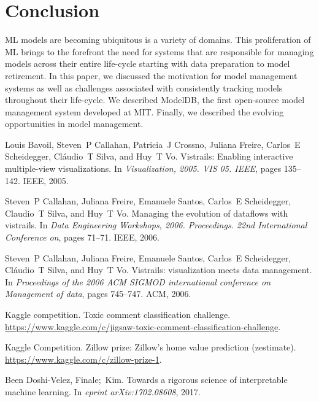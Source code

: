 \documentclass[11pt]{article}
\newcommand{\mdb}{{\sc ModelDB}\xspace}
\begin{document}
\section{Conclusion}
\label{sec:conclusion}
ML models are becoming ubiquitous is a variety of domains.
This proliferation of ML brings to the forefront the need for systems that are responsible for managing models across their entire life-cycle starting with data preparation to model retirement.
In this paper, we discussed the motivation for model management systems as well as challenges associated with consistently tracking models throughout their life-cycle.
We described \mdb, the first open-source model management system developed at MIT.
Finally, we described the evolving opportunities in model management.

\begin{thebibliography}{10} 
\itemsep=1pt 
\begin{small}
Louis Bavoil, Steven~P Callahan, Patricia~J Crossno, Juliana Freire, Carlos~E
  Scheidegger, Cl{\'a}udio~T Silva, and Huy~T Vo.
\newblock Vistrails: Enabling interactive multiple-view visualizations.
\newblock In {\em Visualization, 2005. VIS 05. IEEE}, pages 135--142. IEEE,
  2005.

Steven~P Callahan, Juliana Freire, Emanuele Santos, Carlos~E Scheidegger,
  Claudio~T Silva, and Huy~T Vo.
\newblock Managing the evolution of dataflows with vistrails.
\newblock In {\em Data Engineering Workshops, 2006. Proceedings. 22nd
  International Conference on}, pages 71--71. IEEE, 2006.

Steven~P Callahan, Juliana Freire, Emanuele Santos, Carlos~E Scheidegger,
  Cl{\'a}udio~T Silva, and Huy~T Vo.
\newblock Vistrails: visualization meets data management.
\newblock In {\em Proceedings of the 2006 ACM SIGMOD international conference
  on Management of data}, pages 745--747. ACM, 2006.

Kaggle competition.
\newblock Toxic comment classification challenge.
\newblock
  \url{https://www.kaggle.com/c/jigsaw-toxic-comment-classification-challenge}.

Kaggle Competition.
\newblock Zillow prize: Zillow’s home value prediction (zestimate).
\newblock \url{https://www.kaggle.com/c/zillow-prize-1}.

Been Doshi-Velez, Finale;~Kim.
\newblock Towards a rigorous science of interpretable machine learning.
\newblock In {\em eprint arXiv:1702.08608}, 2017.


\end{small}
\end{thebibliography}
\end{document}
